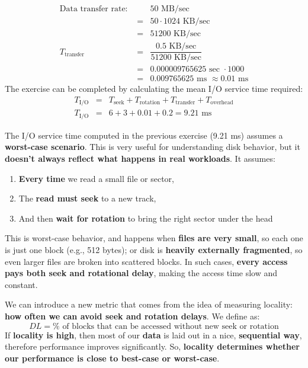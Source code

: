\begin{exercisebox}
\begin{equation*}
        \begin{array}{rcl}
            \text{Data transfer rate: }&& 50 \text{ MB/sec} \\ [1em] 
            &=& 50 \cdot 1024 \text{ KB/sec} \\ [1em] 
            &=& 51200 \text{ KB/sec} \\ [1em]
            T_{\text{transfer}} &=& \dfrac{0.5 \text{ KB/sec}}{51200 \text{ KB/sec}} \\ [1em]
            &=& 0.000009765625 \text{ sec } \cdot 1000 \\ [1em]
            &=& 0.009765625 \text{ ms } \approx 0.01 \text{ ms}
        \end{array}
    \end{equation*}
    The exercise can be completed by calculating the mean I/O service time required:
    \begin{equation*}
        \begin{array}{rcl}
            T_{\text{I/O}} &=& T_{\text{seek}} + T_{\text{rotation}} + T_{\text{transfer}} + T_{\text{overhead}} \\ [.8em]
            T_{\text{I/O}} &=& 6 + 3 + 0.01 + 0.2 = 9.21 \text{ ms}
        \end{array}
    \end{equation*}
\end{exercisebox}

\noindent
The I/O service time computed in the previous exercise (9.21 ms) assumes a \textbf{worst-case scenario}. This is very useful for understanding disk behavior, but it \textbf{doesn't always reflect what happens in real workloads}. It assumes:
\begin{enumerate}
    \item \textbf{Every time} we read a small file or sector,
    \item The \textbf{read must seek} to a new track,
    \item And then \textbf{wait for rotation} to bring the right sector under the head
\end{enumerate}
This is worst-case behavior, and happens when \textbf{files are very small}, so each one is just one block (e.g., 512 bytes); or disk is \textbf{heavily externally fragmented}, so even larger files are broken into scattered blocks. In such cases, \textbf{every access pays both seek and rotational delay}, making the access time slow and constant.

\highspace
We can introduce a new metric that comes from the idea of measuring locality: \textbf{how often we can avoid seek and rotation delays}. We define  as:
\begin{equation}
    DL = \% \text{ of blocks that can be accessed without new seek or rotation}
\end{equation}
If \textbf{locality is high}, then most of our \textbf{data} is laid out in a nice, \textbf{sequential way}, therefore performance improves significantly. So, \textbf{locality determines whether our performance is close to best-case or worst-case}.

